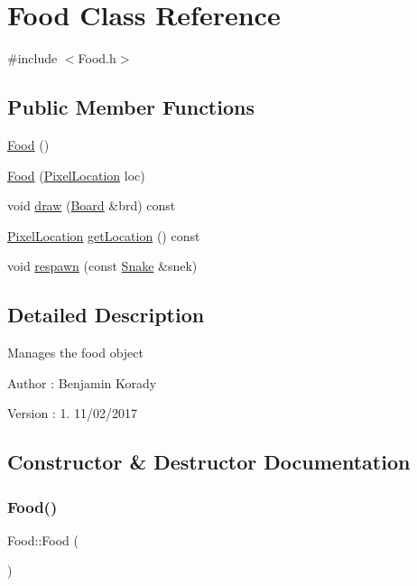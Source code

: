 \hypertarget{class_food}{}\section{Food Class Reference}
\label{class_food}


{\ttfamily \#include $<$Food.\+h$>$}

\subsection*{Public Member Functions}
\begin{DoxyCompactItemize}
\item 
\hyperlink{class_food_a75d4d7f76fd495cc8133302ca9fdc485}{Food} ()
\item 
\hyperlink{class_food_abf88eb6961b943a2d481c08eca91cc2d}{Food} (\hyperlink{class_pixel_location}{Pixel\+Location} loc)
\item 
void \hyperlink{class_food_a2757ddcb688ca74d3e2e79d645e0ed0e}{draw} (\hyperlink{class_board}{Board} \&brd) const
\item 
\hyperlink{class_pixel_location}{Pixel\+Location} \hyperlink{class_food_a7c3ffe081ee2b479696c0c89ed95455c}{get\+Location} () const
\item 
void \hyperlink{class_food_afcd8485cf59e61adcc28cfc237bf3001}{respawn} (const \hyperlink{class_snake}{Snake} \&snek)
\end{DoxyCompactItemize}


\subsection{Detailed Description}
Manages the food object

\begin{DoxyAuthor}{Author}
\+: Benjamin Korady 
\end{DoxyAuthor}
\begin{DoxyVersion}{Version}
\+: 1. 11/02/2017 
\end{DoxyVersion}


\subsection{Constructor \& Destructor Documentation}
\mbox{\label{class_food_a75d4d7f76fd495cc8133302ca9fdc485}} 
\subsubsection{\texorpdfstring{Food()}{Food()}\hspace{0.1cm}{\footnotesize\ttfamily [1/2]}}
{\footnotesize\ttfamily Food\+::\+Food (\begin{DoxyParamCaption}{ }\end{DoxyParamCaption})}


